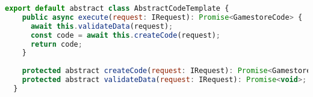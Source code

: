 \begin{lstlisting}[language=JavaScript, caption={Classe Abstrata},captionpos=b, label=alg:ocpexample]
  export default abstract class AbstractCodeTemplate {
    public async execute(request: IRequest): Promise<GamestoreCode> {
      await this.validateData(request);
      const code = await this.createCode(request);
      return code;
    }
  
    protected abstract createCode(request: IRequest): Promise<GamestoreCode>;
    protected abstract validateData(request: IRequest): Promise<void>;
  }
\end{lstlisting}  